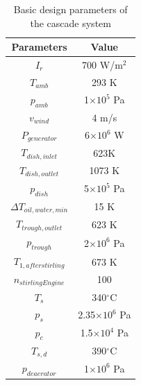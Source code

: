 \documentclass{article}
\begin{document}
\begin{table}[htbp]
	\caption{Basic design parameters of the cascade system}
	\begin{center}
	\begin{tabular}{cc}
		\toprule
		Parameters			&	Value\\
		\midrule
		$I_r$			&	700 W/m$^2$\\
		$T_{amb}$			&	293 K\\
		$p_{amb}$			&	1$\times10^5$ Pa\\
		$v_{wind}$			&	4 m/s\\
		$P_{generator}$		&	6$\times10^6$ W\\
		$T_{dish,inlet}$	&	623K\\
		$T_{dish,outlet}$	&	1073 K\\
		$p_{dish}$			&	5$\times10^5$ Pa\\
		$\Delta{}T_{oil,water,min}$	&	15 K \\
		$T_{trough,outlet}$	&	623 K\\
		$p_{trough}$		&	2$\times10^6$ Pa\\
		$T_{1,afterstirling}$	&	673 K\\
		$n_{stirlingEngine}$	&	100\\
		$T_s$				&	340$^\circ$C\\
		$p_s$				&	2.35$\times10^6$ Pa\\
		$p_c$				&	1.5$\times10^4$ Pa\\
		$T_{s,d}$			&	390$^\circ$C\\
		$p_{deaerator}$ 	& 	1$\times10^6$ Pa\\
		\bottomrule
	\end{tabular}
	\end{center}
	\label{tab:system-data}
\end{table}
\end{document}
